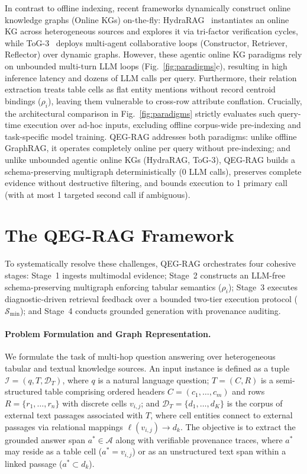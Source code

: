 \documentclass[runningheads]{llncs}
\begin{document}
In contrast to offline indexing, recent frameworks dynamically construct online knowledge graphs (Online KGs) on-the-fly: HydraRAG~\cite{tan2025hydrarag} instantiates an online KG across heterogeneous sources and explores it via tri-factor verification cycles, while ToG-3~\cite{wu2025tog3} deploys multi-agent collaborative loops (Constructor, Retriever, Reflector) over dynamic graphs. However, these agentic online KG paradigms rely on unbounded multi-turn LLM loops (Fig.~\ref{fig:paradigms}c), resulting in high inference latency and dozens of LLM calls per query. Furthermore, their relation extraction treats table cells as flat entity mentions without record centroid bindings ($\rho_i$), leaving them vulnerable to cross-row attribute conflation. Crucially, the architectural comparison in Fig.~\ref{fig:paradigms} strictly evaluates such query-time execution over ad-hoc inputs, excluding offline corpus-wide pre-indexing and task-specific model training. QEG-RAG addresses both paradigms: unlike offline GraphRAG, it operates completely online per query without pre-indexing; and unlike unbounded agentic online KGs (HydraRAG, ToG-3), QEG-RAG builds a schema-preserving multigraph deterministically (0 LLM calls), preserves complete evidence without destructive filtering, and bounds execution to 1 primary call (with at most 1 targeted second call if ambiguous).

\section{The QEG-RAG Framework}
\label{sec:method}



To systematically resolve these challenges, QEG-RAG orchestrates four cohesive stages: Stage~1 ingests multimodal evidence; Stage~2 constructs an LLM-free schema-preserving multigraph enforcing tabular semantics ($\rho_i$); Stage~3 executes diagnostic-driven retrieval feedback over a bounded two-tier execution protocol ($\mathcal{S}_{\min}$); and Stage~4 conducts grounded generation with provenance auditing.

\paragraph{Problem Formulation and Graph Representation.}
\label{sec:formulation}
We formulate the task of multi-hop question answering over heterogeneous tabular and textual knowledge sources. An input instance is defined as a tuple $\mathcal{I} = (q, T, \mathcal{D}_T)$, where $q$ is a natural language question; $T = (C, R)$ is a semi-structured table comprising ordered headers $C = (c_1, \dots, c_m)$ and rows $R = \{r_1, \dots, r_n\}$ with discrete cells $v_{i,j}$; and $\mathcal{D}_T = \{d_1, \dots, d_K\}$ is the corpus of external text passages associated with $T$, where cell entities connect to external passages via relational mappings $\ell(v_{i,j}) \rightarrow d_k$. The objective is to extract the grounded answer span $a^* \in \mathcal{A}$ along with verifiable provenance traces, where $a^*$ may reside as a table cell ($a^* = v_{i,j}$) or as an unstructured text span within a linked passage ($a^* \subset d_k$).
\end{document}
